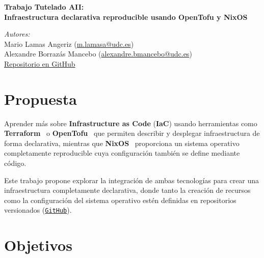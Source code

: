 \documentclass[a4paper, 11pt]{article}
\begin{document}
\begin{titlepage}
    \vspace*{\fill}

    \begin{center}
        {\huge \textbf{Trabajo Tutelado AII: \\ [0.5cm] Infraestructura declarativa reproducible usando OpenTofu y NixOS}}
    \end{center}

    \vspace*{\fill}

    \begin{flushright}
        \textit{Autores:} \\
        Mario Lamas Angeriz (\href{mailto:m.lamasa@udc.es}{m.lamasa@udc.es}) \\
        Alexandre Borrazás Mancebo (\href{mailto:alexandre.bmancebo@udc.es}{alexandre.bmancebo@udc.es}) \\[0.5em]
        \href{https://github.com/alexborrazasm/terraform-proxmox-nixos-infra}{Repositorio en GitHub} \\
    \end{flushright}
\end{titlepage}

\newpage
\thispagestyle{empty}
\tableofcontents
\newpage
\setcounter{page}{1}

\section{Propuesta}

Aprender más sobre \textbf{Infrastructure as Code} (\textbf{IaC}) usando herramientas
como \textbf{Terraform}~\cite{terraform} o \textbf{OpenTofu}~\cite{opentofu} que permiten describir y desplegar
infraestructura de forma declarativa, mientras que \textbf{NixOS}~\cite{nixos} proporciona un
sistema operativo completamente reproducible cuya configuración también se define
mediante código.

Este trabajo propone explorar la integración de ambas tecnologías para crear una 
infraestructura completamente declarativa, donde tanto la creación de recursos 
como la configuración del sistema operativo estén definidas en repositorios 
versionados (\href{https://github.com/alexborrazasm/terraform-proxmox-nixos-infra}{\texttt{GitHub}}).

\section{Objetivos}
\end{document}
